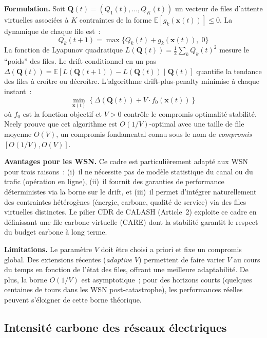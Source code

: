 \textbf{Formulation.} Soit $\mathbf{Q}(t) = (Q_1(t), \ldots, Q_K(t))$ un vecteur de files d'attente virtuelles associées à $K$ contraintes de la forme $\mathbb{E}[g_k(\mathbf{x}(t))] \leq 0$. La dynamique de chaque file est~:
\begin{equation}\label{eq:virtual-queue}
    Q_k(t+1) = \max\{Q_k(t) + g_k(\mathbf{x}(t)),\; 0\}
\end{equation}
La fonction de Lyapunov quadratique $L(\mathbf{Q}(t)) = \frac{1}{2}\sum_k Q_k(t)^2$ mesure le ``poids'' des files. Le drift conditionnel en un pas $\Delta(\mathbf{Q}(t)) = \mathbb{E}[L(\mathbf{Q}(t+1)) - L(\mathbf{Q}(t)) \mid \mathbf{Q}(t)]$ quantifie la tendance des files à croître ou décroître. L'algorithme drift-plus-penalty minimise à chaque instant~:
\begin{equation}\label{eq:dpp-general}
    \min_{\mathbf{x}(t)} \left\{ \Delta(\mathbf{Q}(t)) + V \cdot f_0(\mathbf{x}(t)) \right\}
\end{equation}
où $f_0$ est la fonction objectif et $V > 0$ contrôle le compromis optimalité-stabilité. Neely \cite{neely2010lyapunov} prouve que cet algorithme est $O(1/V)$-optimal avec une taille de file moyenne $O(V)$, un compromis fondamental connu sous le nom de \emph{compromis $[O(1/V), O(V)]$}.

\textbf{Avantages pour les WSN.} Ce cadre est particulièrement adapté aux WSN pour trois raisons~: (i)~il ne nécessite pas de modèle statistique du canal ou du trafic (opération en ligne), (ii)~il fournit des garanties de performance déterministes via la borne sur le drift, et (iii)~il permet d'intégrer naturellement des contraintes hétérogènes (énergie, carbone, qualité de service) via des files virtuelles distinctes. Le pilier CDR de CALASH (Article~2) exploite ce cadre en définissant une file carbone virtuelle (CARE) dont la stabilité garantit le respect du budget carbone à long terme.

\textbf{Limitations.} Le paramètre $V$ doit être choisi a priori et fixe un compromis global. Des extensions récentes (\emph{adaptive $V$}) permettent de faire varier $V$ au cours du temps en fonction de l'état des files, offrant une meilleure adaptabilité. De plus, la borne $O(1/V)$ est asymptotique~; pour des horizons courts (quelques centaines de tours dans les WSN post-catastrophe), les performances réelles peuvent s'éloigner de cette borne théorique.

\subsection{Intensité carbone des réseaux électriques}

